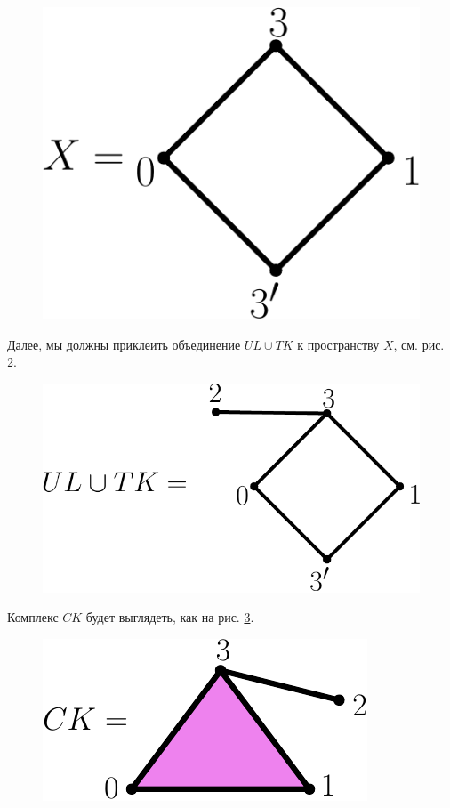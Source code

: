 \documentclass[14pt, dvipsnames, twoside]{extarticle}
\theoremstyle{definition}
\theoremstyle{remark}
\begin{document}
\begin{figure}
\begin{center}
\includegraphics[scale=0.7]{pict2}
\caption{}\label{pict_2}
\end{center}
\end{figure}


Далее, мы должны приклеить объединение $UL\cup TK$ к пространству $X$, см. рис. \ref{pict_3}. 

\begin{figure}
\begin{center}
\includegraphics[scale=0.7]{pict3}
\caption{}\label{pict_3}
\end{center}
\end{figure}

Комплекс $CK$ будет выглядеть, как на рис. \ref{pict_8}.

\begin{figure}
\begin{center}
\includegraphics[scale=1]{pict8}
\caption{}\label{pict_8}
\end{center}
\end{figure}
\end{document}
